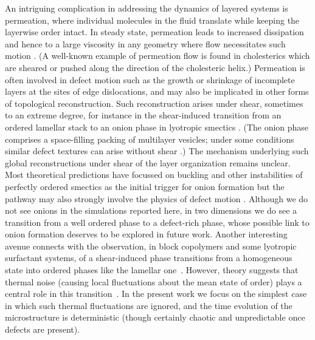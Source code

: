 \documentclass[8.5pt,twoside,twocolumn]{article}
\begin{document}
An intriguing complication in addressing the dynamics of layered systems
is permeation,
where individual molecules in the fluid translate while keeping the
layerwise order intact. In steady state, permeation leads to increased dissipation
and hence to a large viscosity in any geometry where flow necessitates such motion \cite{deGennes}. (A well-known example of permeation flow
is found in cholesterics which are sheared or pushed along the direction
of the cholesteric helix.) Permeation is often involved in defect motion such as the growth or shrinkage of incomplete layers at the sites of edge dislocations, and may also be implicated in other forms of topological reconstruction. Such reconstruction arises under shear, sometimes to an extreme degree, for instance in the shear-induced transition from an ordered lamellar stack to an onion phase in lyotropic smectics \cite{Diat93,Panizza96,Iwashita07,Gradzielski03}. (The onion phase comprises a space-filling packing of multilayer vesicles; under some conditions similar defect textures can arise without shear \cite{Gomati87,Boltenhagen92,Fournier94,Ramos04}.) The mechanism underlying such global reconstructions under shear of the layer organization remains unclear. Most theoretical predictions have focussed on buckling and other instabilities of perfectly ordered smectics as the initial trigger for onion formation \cite{Zilman99,Courbin02,Guo2002,Soddemann2004, Stewart2009} but the pathway may also strongly involve the physics of defect motion \cite{Zipfel99, Leon00}. Although we do not see onions in the simulations reported here, in two dimensions we do see a transition from a well ordered phase to a defect-rich phase, whose possible link to onion formation deserves to be explored in future work. Another interesting avenue connects with the observation, in block copolymers and some lyotropic surfactant systems, of a shear-induced
phase transitions from a homogeneous state into ordered phases
like the lamellar one~\cite{Cates89,Koppi93,Fredrickson94}. However, theory suggests that thermal noise (causing local fluctuations about the mean state of order) plays a central role in this transition~\cite{Cates89}. In the present work we focus on the simplest case in which such thermal fluctuations are ignored, and the time evolution of the microstructure is deterministic (though certainly chaotic and unpredictable
once defects are present).
\end{document}
